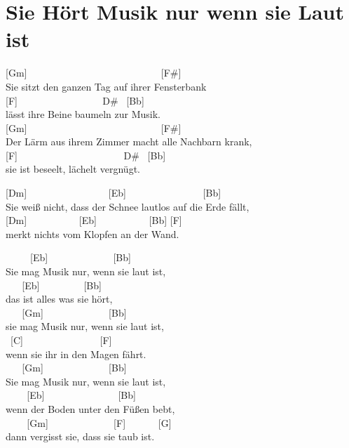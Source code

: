 \documentclass[
  letterpaper,
  twoside=false]{scrbook}
\begin{document}
\hypertarget{sie-huxf6rt-musik-nur-wenn-sie-laut-ist}{%
\chapter{Sie Hört Musik nur wenn sie Laut
ist}\label{sie-huxf6rt-musik-nur-wenn-sie-laut-ist}}

{[}Gm{]} ~ ~ ~ ~ ~ ~ ~ ~ ~ ~ ~ ~ ~ ~ ~ ~ {[}F\#{]}\\
Sie sitzt den ganzen Tag auf ihrer Fensterbank\\
{[}F{]} ~ ~ ~ ~ ~ ~ ~ ~ ~ ~ D\# ~{[}Bb{]}\\
lässt ihre Beine baumeln zur Musik.\\
{[}Gm{]} ~ ~ ~ ~ ~ ~ ~ ~ ~ ~ ~ ~ ~ ~ ~ ~ {[}F\#{]}\\
Der Lärm aus ihrem Zimmer macht alle Nachbarn krank,\\
{[}F{]} ~ ~ ~ ~ ~ ~ ~ ~ ~ ~ ~ ~ ~D\# ~{[}Bb{]}\\
sie ist beseelt, lächelt vergnügt.

{[}Dm{]} ~ ~ ~ ~ ~ ~ ~ ~ ~ ~{[}Eb{]} ~ ~ ~ ~ ~ ~ ~ ~ ~ {[}Bb{]}\\
Sie weiß nicht, dass der Schnee lautlos auf die Erde fällt,\\
{[}Dm{]} ~ ~ ~ ~ ~ ~ {[}Eb{]} ~ ~ ~ ~ ~ ~ {[}Bb{]} {[}F{]}\\
merkt nichts vom Klopfen an der Wand.

~ ~ ~ {[}Eb{]} ~ ~ ~ ~ ~ ~ ~ ~{[}Bb{]}\\
Sie mag Musik nur, wenn sie laut ist,\\
\hspace*{0.333em} ~ ~ {[}Eb{]} ~ ~ ~ ~ ~ {[}Bb{]}\\
das ist alles was sie hört,\\
\hspace*{0.333em} ~ ~ {[}Gm{]} ~ ~ ~ ~ ~ ~ ~ ~{[}Bb{]}\\
sie mag Musik nur, wenn sie laut ist,\\
\hspace*{0.333em} ~{[}C{]} ~ ~ ~ ~ ~ ~ ~ ~ ~ {[}F{]}\\
wenn sie ihr in den Magen fährt.\\
\hspace*{0.333em} ~ ~ {[}Gm{]} ~ ~ ~ ~ ~ ~ ~ ~{[}Bb{]}\\
Sie mag Musik nur, wenn sie laut ist,\\
\hspace*{0.333em} ~ ~ ~{[}Eb{]} ~ ~ ~ ~ ~ ~ ~ ~ ~{[}Bb{]}\\
wenn der Boden unter den Füßen bebt,\\
\hspace*{0.333em} ~ ~ ~{[}Gm{]} ~ ~ ~ ~ ~ ~ ~ ~{[}F{]} ~ ~ ~ ~{[}G{]}\\
dann vergisst sie, dass sie taub ist.
\end{document}
